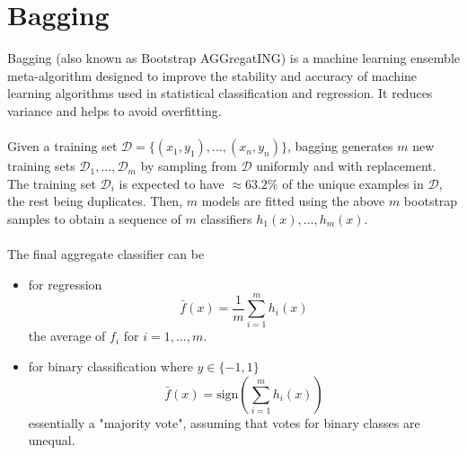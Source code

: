 \documentclass[12pt]{article}
\begin{document}
\section{Bagging}
Bagging (also known as Bootstrap AGGregatING) is a machine learning ensemble meta-algorithm designed to improve the stability and accuracy of machine learning algorithms used in statistical classification and regression. It reduces variance and helps to avoid overfitting. \\\\
Given a training set $\mathcal{D} = \{(x_1,y_1),\dots,(x_n,y_n)\}$, bagging generates $m$ new training sets $\mathcal{D}_1,\dots,\mathcal{D}_m$ by sampling from $\mathcal{D}$ uniformly and with replacement. The training set $\mathcal{D}_i$ is expected to have $\approx 63.2\%$ of the unique examples in $\mathcal{D}$, the rest being duplicates. Then, $m$ models are fitted using the above $m$ bootstrap samples to obtain a sequence of $m$ classifiers $h_1(x),\dots,h_m(x)$.\\\\
The final aggregate classifier can be
\begin{itemize}
    \item for regression
    $$\bar{f}(x) = \frac{1}{m} \sum_{i=1}^{m} h_i(x)$$
    the average of $f_i$ for $i =1,\dots,m$.
    \item for binary classification where $y \in \{-1,1\}$
    $$\bar{f}(x) = \text{sign}(\sum_{i=1}^{m} h_i(x))$$
    essentially a "majority vote", assuming that votes for binary classes are unequal.
\end{itemize}
\end{document}
